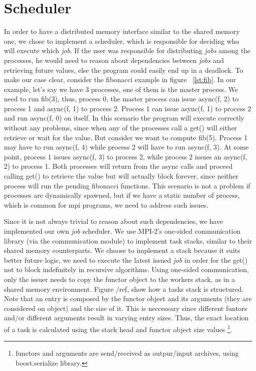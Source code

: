 \section{Scheduler}
\label{sect:scheduler}
In order to have a distributed memory interface similar to the shared memory one, we chose to implement 
a scheduler, which is responsible for deciding who will execute which \emph{job}.  If the user was 
responsible for distributing \emph{jobs} among the processes,  he would need to reason about dependencies
between \emph{jobs} and retrieving future values, else the program could easily end up in a deadlock.
To make our case clear, consider the fibonacci example in figure ~\ref{lst:fib}.  
In our example, let's say we have
3 processes, one of them is the master process.  We need to run fib(3), thus, process 0, the master process 
can issue async(f, 2) to process 1 and async(f, 1) to process 2.  Process 1 can issue async(f, 1) to 
process 2 and run async(f, 0) on itself.  In this scenario the program will execute correctly without any
problems, since when any of the processes call a get() will either retrieve or wait for the value.  But 
consider we want to compute fib(5).  Process 1 may have to run async(f, 4) while process 2 will have to run
async(f, 3).  At some point, process 1 issues async(f, 3) to process 2, while process 2 issues an async(f, 2)
to process 1.  Both processes will return from the async calls and proceed calling get() to retrieve the value
but will actually block forever, since neither process will run the pending fibonacci functions.  This scenario
is not a problem if processes are dynamically spawned, but if we have a static number of process, which is
common for mpi programs, we need to address such issues.  


Since it is not always trivial to reason about such dependencies, we have implemented our own \emph{job} 
scheduler.  We use MPI-2's one-sided communication library (via the communication module) to implement task
stacks, similar to their shared memory counterparts. We choose to implement a stack because it suits better
future logic, we need to execute the latest issued \emph{job} in order for the get() not to block indefinitely
in recursive algorithms.  Using one-sided communication, only the issuer needs to copy the functor object to
the workers stack, as in a shared memory environment.  Figure /ref, show how a tasks stack is structured.  
Note that an entry is composed by the functor object and its arguments (they are considered on object) and the 
size of it. This is neccessary since different funtors and/or different arguments result in varying entry sizes.
Thus, the exact location of a task is calculated using the stack head and functor object size values \footnote{
functors and arguments are send/received as outpur/input archives, using boost.serialize library.}.


